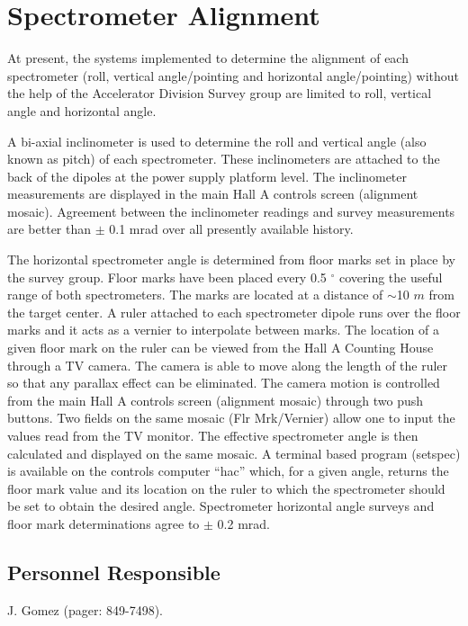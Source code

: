 \section{Spectrometer Alignment}

At present, the systems implemented to determine the alignment of each spectrometer
(roll, vertical angle/pointing and horizontal angle/pointing) without the help of the
Accelerator Division Survey group are limited to roll, vertical angle and horizontal angle.

A bi-axial inclinometer is used to determine the roll and vertical angle (also known as pitch)
of each spectrometer. These inclinometers are attached to the back of the dipoles at the power
supply platform level. The inclinometer measurements are displayed in the main Hall A controls
screen (alignment mosaic). Agreement between the inclinometer readings and survey measurements
are better than $\pm$ 0.1 mrad over all presently available history.

The horizontal spectrometer angle is determined from floor marks set in
place by the survey group. Floor marks have been placed every 0.5 $^\circ$ covering the useful range of
both spectrometers. The marks are located at a distance of $\sim$10 $m$ from the target center.
A ruler attached to each spectrometer dipole runs over the floor marks and it acts as a vernier to interpolate
between marks. The location of a given floor mark on the ruler can be viewed from the Hall A Counting
House through a TV camera. The camera is able to move along the length of the ruler so that any
parallax effect can be eliminated. The camera motion is controlled from the main Hall A controls screen
(alignment mosaic) through two push buttons. Two fields on the
same mosaic (Flr Mrk/Vernier) allow one to input
the values read from the TV monitor. The effective spectrometer angle is then calculated and displayed
on the same mosaic. A terminal based program (setspec) is available on the controls computer ``hac'' which, for
a given angle, returns the floor mark value and its location on the ruler to which the spectrometer should be set
to obtain the desired angle. Spectrometer horizontal angle surveys and floor mark determinations
agree to $\pm$ 0.2 mrad.

\subsection{Personnel Responsible}
J. Gomez (pager: 849-7498). 

%
